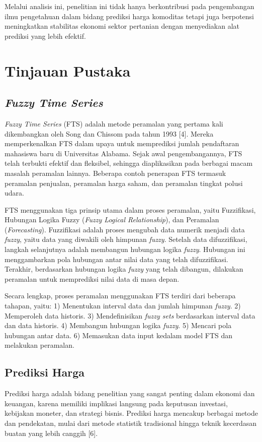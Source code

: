 \documentclass[conference]{IEEEtran}
\begin{document}
Melalui analisis ini, penelitian ini tidak hanya berkontribusi pada pengembangan ilmu pengetahuan dalam bidang prediksi harga komoditas tetapi juga berpotensi meningkatkan stabilitas ekonomi sektor pertanian dengan menyediakan alat prediksi yang lebih efektif.


\section{Tinjauan Pustaka}

\subsection{\textit{Fuzzy Time Series}}
\textit{Fuzzy Time Series} (FTS) adalah metode peramalan yang pertama kali dikembangkan oleh Song dan Chissom pada tahun 1993 [4]. Mereka memperkenalkan FTS dalam upaya untuk memprediksi jumlah pendaftaran mahasiswa baru di Universitas Alabama. Sejak awal pengembangannya, FTS telah terbukti efektif dan fleksibel, sehingga diaplikasikan pada berbagai macam masalah peramalan lainnya. Beberapa contoh penerapan FTS termasuk peramalan penjualan, peramalan harga saham, dan peramalan tingkat polusi udara.

FTS menggunakan tiga prinsip utama dalam proses peramalan, yaitu Fuzzifikasi, Hubungan Logika Fuzzy (\textit{Fuzzy Logical Relationship}), dan Peramalan (\textit{Forecasting}). Fuzzifikasi adalah proses mengubah data numerik menjadi data \textit{fuzzy}, yaitu data yang diwakili oleh himpunan \textit{fuzzy}. Setelah data difuzzifikasi, langkah selanjutnya adalah membangun hubungan logika \textit{fuzzy}. Hubungan ini menggambarkan pola hubungan antar nilai data yang telah difuzzifikasi. Terakhir, berdasarkan hubungan logika \textit{fuzzy} yang telah dibangun, dilakukan peramalan untuk memprediksi nilai data di masa depan.

Secara lengkap, proses peramalan menggunakan FTS terdiri dari beberapa tahapan, yaitu:
    1) Menentukan interval data dan jumlah himpunan \textit{fuzzy}.
    2) Memperoleh data historis.
    3) Mendefinisikan \textit{fuzzy sets} berdasarkan interval data dan data historis.
    4) Membangun hubungan logika \textit{fuzzy}.
    5) Mencari pola hubungan antar data.
    6) Memasukan data input kedalam model FTS dan melakukan peramalan.

\subsection{Prediksi Harga}
Prediksi harga adalah bidang penelitian yang sangat penting dalam ekonomi dan keuangan, karena memiliki implikasi langsung pada keputusan investasi, kebijakan moneter, dan strategi bisnis. Prediksi harga mencakup berbagai metode dan pendekatan, mulai dari metode statistik tradisional hingga teknik kecerdasan buatan yang lebih canggih [6].
\end{document}

